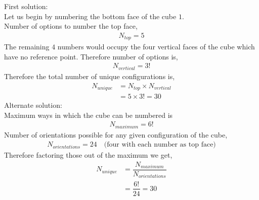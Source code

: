 \begin{solution}
  First solution: \\
  Let us begin by numbering the bottom face of the cube $1$. \\
  Number of options to number the top face,
  \begin{align}
     N_{top} = 5 \nonumber
  \end{align}
  The remaining $4$ numbers would occupy the four vertical faces of the cube which have no reference point. Therefore number of options is,
  \begin{align}
     N_{vertical} = 3! \nonumber
  \end{align}
  Therefore the total number of unique configurations is,
  \begin{align}
    N_{unique} &= N_{top} \times N_{vertical} \nonumber \\
               &= 5 \times 3! = 30 \nonumber 
  \end{align}
  Alternate solution:\\
  Maximum ways in which the cube can be numbered is 
  \begin{align}
    N_{maximum} = 6! \nonumber
  \end{align}
  Number of orientations possible for any given configuration of the cube,
  \begin{align}
    N_{orientations} = 24 \quad\text{(four with each number as top face)} \nonumber
  \end{align}
  Therefore factoring those out of the maximum we get,
  \begin{align}
    N_{unique} &= \dfrac{N_{maximum}}{N_{orientations}} \nonumber \\
               &= \dfrac{6!}{24} = 30 \nonumber
  \end{align}   
\end{solution}


